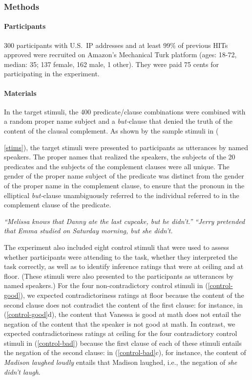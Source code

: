 \documentclass[11pt,fleqn]{article}
\newcommand{\6}{\mbox{$[\hspace*{-.6mm}[$}}
\newcommand{\9}{\mbox{$]\hspace*{-.6mm}]$}}
\begin{document}
\subsubsection{Methods}

\paragraph{Participants} 300 participants with U.S.\ IP addresses and at least 99\% of previous HITs approved were recruited on Amazon's Mechanical Turk platform (ages: 18-72, median: 35; 137 female, 162 male, 1 other). They were paid 75 cents for participating in the experiment.

\paragraph{Materials} In the target stimuli, the 400 predicate/clause combinations were combined with a random proper name subject and a {\em but-}clause that denied the truth of the content of the clausal complement. As shown by the sample stimuli in ({\ref{stims}), the target stimuli were presented to participants as utterances by named speakers. The proper names that realized the speakers, the subjects of the 20 predicates and the subjects of the complement clauses were all unique. The gender of the proper name subject of the predicate was distinct from the gender of the proper name in the complement clause, to ensure that the pronoun in the elliptical {\em but-}clause unambiguously referred to the individual referred to in the complement clause of the predicate.

\begin{exe}
\ex\label{stims}
\begin{xlist}
 {\em ``Melissa knows that Danny ate the last cupcake, but he didn't.''}
 {\em ``Jerry pretended that Emma studied on Saturday morning, but she didn't.}
\end{xlist}
\end{exe}

The experiment also included eight control stimuli that were used to assess whether participants were attending to the task, whether they interpreted the task correctly, as well as to identify inference ratings that were at ceiling and at floor. (These stimuli were also presented to the participants as utterances by named speakers.) For the four non-contradictory control stimuli in (\ref{control-good}), we expected contradictoriness ratings at floor because the content of the second clause does not contradict the content of the first clause: for instance, in (\ref{control-good}d), the content that Vanessa is good at math does not entail the negation of the content that the speaker is not good at math. In contrast, we expected contradictoriness ratings at ceiling for the four contradictory control stimuli in (\ref{control-bad}) because the first clause of each of these stimuli entails the negation of the second clause: in (\ref{control-bad}c), for instance, the content of {\em Madison laughed loudly} entails that Madison laughed, i.e., the negation of {\em she didn't laugh}.

}
\end{document}
